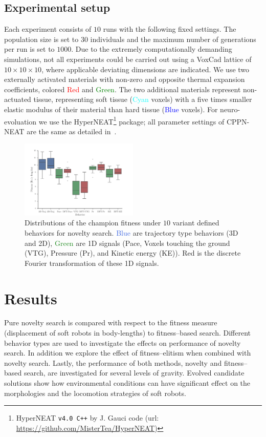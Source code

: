 \documentclass{sig-alternate}
\begin{document}
\subsection{Experimental setup}
Each experiment consists of $10$ runs with the following fixed settings. The population size is set to $30$ individuals and the maximum number of generations per run is set to $1000$. Due to the extremely computationally demanding simulations, not all experiments could be carried out using a VoxCad lattice of $10 \times 10 \times 10$, where applicable deviating dimensions are indicated. We use two externally activated materials with non-zero and opposite thermal expansion coefficients, colored \textcolor{Red}{Red} and \textcolor{Green}{Green}. The two additional materials represent non-actuated tissue, representing soft tissue (\textcolor{Cyan}{Cyan} voxels) with a five times smaller elastic modulus of their material than hard tissue (\textcolor{Blue}{Blue} voxels). %
For neuro-evoluation we use the HyperNEAT\footnote{HyperNEAT \texttt{v4.0 C++}  by J. Gauci code (url: \small{\url{ https://github.com/MisterTea/HyperNEAT})}} package; all parameter settings of CPPN-NEAT are the same as detailed in~\cite{cheney2013unshackling}.

\begin{figure}[t!]
\centering
\includegraphics[width=0.5\textwidth]{../Figures/Results/BehaviorPerformanceNoveltyOnly.pdf}
\caption{Distributions of the champion fitness under $10$ variant defined behaviors for novelty search. \textcolor{RoyalBlue}{Blue} are trajectory type behaviors (3D and 2D), \textcolor{ForestGreen}{Green} are 1D signals (Pace, Voxels touching the ground (VTG), Pressure (Pr), and Kinetic energy (KE)). \textcolor{BrickRed}{Red} is the discrete Fourier transformation of these 1D signals.}
\label{fig:BehaviorsPerformance}
\end{figure}

\section{Results}
Pure novelty search is compared with respect to the fitness measure (displacement of soft robots in body-lengths) to fitness--based search. Different behavior types are used to investigate the effects on performance of novelty search. In addition we explore the effect of fitness--elitism when combined with novelty search. Lastly, the performance of both methods, novelty and fitness--based search, are investigated for several levels of gravity. Evolved candidate solutions show how environmental conditions can have significant effect on the morphologies and the locomotion strategies of soft robots.
\end{document}
